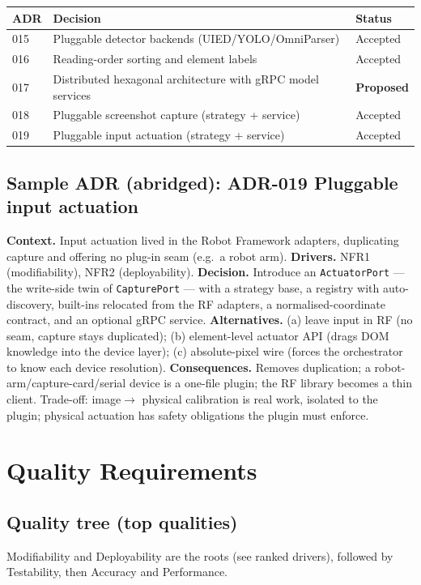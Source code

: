 \documentclass[11pt,a4paper]{report}
\newcommand{\code}[1]{\texttt{#1}}
\begin{document}
\begin{longtable}{@{}p{1.4cm}p{7.8cm}p{2.4cm}@{}}
\toprule
\textbf{ADR} & \textbf{Decision} & \textbf{Status} \\
\midrule
\endhead
015 & Pluggable detector backends (UIED/YOLO/OmniParser) & Accepted \\
016 & Reading-order sorting and element labels & Accepted \\
017 & Distributed hexagonal architecture with gRPC model services & \textbf{Proposed} \\
018 & Pluggable screenshot capture (strategy + service) & Accepted \\
019 & Pluggable input actuation (strategy + service) & Accepted \\
\bottomrule
\end{longtable}

\section{Sample ADR (abridged): ADR-019 Pluggable input actuation}
\textbf{Context.} Input actuation lived in the Robot Framework adapters, duplicating
capture and offering no plug-in seam (e.g.\ a robot arm). \textbf{Drivers.} NFR1
(modifiability), NFR2 (deployability). \textbf{Decision.} Introduce an
\code{ActuatorPort} --- the write-side twin of \code{CapturePort} --- with a
strategy base, a registry with auto-discovery, built-ins relocated from the RF
adapters, a normalised-coordinate contract, and an optional gRPC service.
\textbf{Alternatives.} (a) leave input in RF (no seam, capture stays duplicated);
(b) element-level actuator API (drags DOM knowledge into the device layer);
(c) absolute-pixel wire (forces the orchestrator to know each device resolution).
\textbf{Consequences.} Removes duplication; a robot-arm/capture-card/serial device
is a one-file plugin; the RF library becomes a thin client. Trade-off: image$\to$
physical calibration is real work, isolated to the plugin; physical actuation has
safety obligations the plugin must enforce.

\chapter{Quality Requirements}
\section{Quality tree (top qualities)}
Modifiability and Deployability are the roots (see ranked drivers), followed by
Testability, then Accuracy and Performance.
\end{document}
